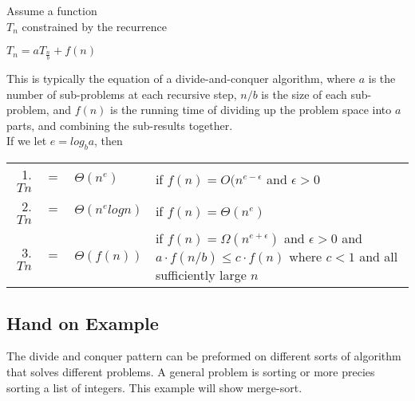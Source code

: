 \begin{theorem}
Assume a function\\ $T_n$ constrained by the recurrence
\begin{center}
$T_n = aT_{\frac{n}{b}}+ f(n)$
\end{center}
This is typically the equation of a divide-and-conquer algorithm, where $a$ is the number of sub-problems at each recursive
step, $n/b$ is the size of each sub-problem, and $f(n)$ is the running
time of dividing up the problem space into $a$ parts, and combining
the sub-results together.\\
If we let $e = log_b a$, then
\begin{center}
\begin{tabular}{r c l l}
1. $Tn$ & $=$ & $\Theta(n^{e})$ &  if $f(n) = O(n^{e - \epsilon}$ and $\epsilon > 0$\\
2. $Tn$ & $=$ & $\Theta(n^{e} log n)$ & if $f(n) = \Theta(n^e)$\\
3. $Tn$ & $=$ & $\Theta(f(n))$ & \begin{minipage}[t]{0.6 \columnwidth}
  if $f(n) = \Omega(n^{e+\epsilon})$ and $\epsilon > 0$ and $a \cdot f(n/b) \leq c \cdot f(n)$ where $c < 1$ and all sufficiently large $n$
  \end{minipage}
\end{tabular}
\end{center}
\qeda
\end{theorem}

\subsection{Hand on Example}
The divide and conquer pattern can be preformed on different sorts of algorithm that solves different problems. A general problem is sorting or more precies sorting a list of integers. This example will show merge-sort.

